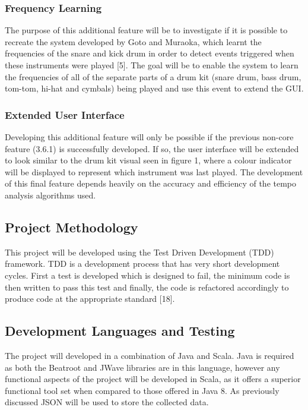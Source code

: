 \documentclass[a4paper, 11pt]{article}
\begin{document}
\subsubsection{Frequency Learning}
The purpose of this additional feature will be to investigate if it is possible to recreate the system developed by Goto and Muraoka, which learnt the frequencies of the snare and kick drum in order to detect events triggered when these instruments were played [5]. The goal will be to enable the system to learn the frequencies of all of the separate parts of a drum kit (snare drum, bass drum, tom-tom, hi-hat and cymbals) being played and use this event to extend the GUI.

\subsubsection{Extended User Interface}
Developing this additional feature will only be possible if the previous non-core feature (3.6.1) is successfully developed. If so, the user interface will be extended to look similar to the drum kit visual seen in figure 1, where a colour indicator will be displayed to represent which instrument was last played. The development of this final feature depends heavily on the accuracy and efficiency of the tempo analysis algorithms used.

\subsection{Project Methodology}
This project will be developed using the Test Driven Development (TDD) framework. TDD is a development process that has very short development cycles. First a test is developed which is designed to fail, the minimum code is then written to pass this test and finally, the code is refactored accordingly to produce code at the appropriate standard [18].

\subsection{Development Languages and Testing}
The project will developed in a combination of Java and Scala. Java is required as both the Beatroot and JWave libraries are in this language, however any functional aspects of the project will be developed in Scala, as it offers a superior functional tool set when compared to those offered in Java 8. As previously discussed JSON will be used to store the collected data.
\end{document}
